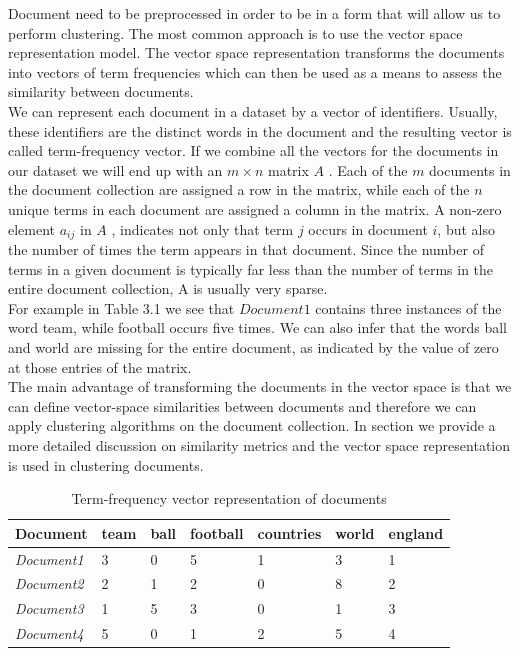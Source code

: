 Document need to be preprocessed in order to be in a form that will allow us to perform clustering. 
The most common approach is to use the vector space representation model. The vector space representation transforms the 
documents into vectors of term frequencies which can then be used as a means to assess the similarity between documents.\\
We can represent each document in a dataset by a vector of identifiers. Usually, these identifiers are the distinct words in the document and 
the resulting vector is called term-frequency vector. If we combine all the vectors for the documents in our dataset we will end up with an 
\boldmath $m \times n$  \unboldmath  matrix \boldmath $A$ \unboldmath. Each of the $m$ documents in the document collection are assigned a row 
in the matrix, while each of the $n$ unique terms in each document are assigned a column in the matrix. A non-zero element $a_{ij}$ in \boldmath 
$A$ \unboldmath, indicates not only that term $j$ occurs in document $i$, but also the number of times the term appears in that document. Since the number of terms in a given 
document is typically far less than the number of terms in the entire document collection, A is usually very sparse.\\
For example in Table 3.1 we see that $Document1$ contains three instances of the word team, while football occurs five times. We can also infer that
the words ball and world are missing for the entire document, as indicated by the value of zero at those entries of the matrix.\\  
The main advantage of transforming the documents in the vector space is that we can define vector-space similarities between documents and therefore
we can apply clustering algorithms on the document collection. In section we provide a more detailed discussion on similarity metrics and the vector space 
representation is used in clustering documents.

\begin{table}[tbp]
\centering
\begin{tabular}{ l  l  l  l  l  l  l }
  \hline
  \textbf{Document} & \textbf{team} & \textbf{ball} & \textbf{football} & \textbf{countries} & \textbf{world} & \textbf{england} \\ \hline
  \emph{Document1} & 3 & 0 & 5 & 1 & 3 & 1 \\
  \emph{Document2} & 2 & 1 & 2 & 0 & 8 & 2\\
  \emph{Document3} & 1 & 5 & 3 & 0 & 1 & 3\\
  \emph{Document4} & 5 & 0 & 1 & 2 & 5 & 4\\
  \hline
\end{tabular}
\caption{Term-frequency vector representation of documents}
\label{termfrequencyTable}
\end{table}

